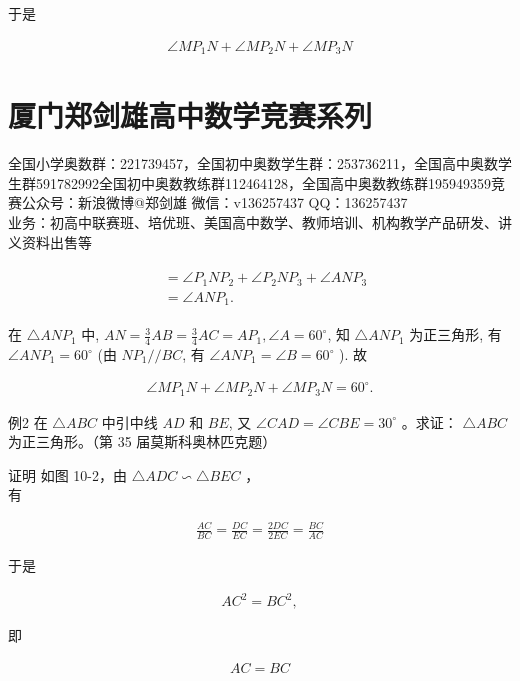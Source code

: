 \documentclass[10pt]{article}
\begin{document}
于是

\begin{align*}
\angle M P_{1} N+\angle M P_{2} N+\angle M P_{3} N
\end{align*}

\section*{厦门郑剑雄高中数学竞赛系列}
全国小学奥数群：221739457，全国初中奥数学生群：253736211，全国高中奥数学生群591782992全国初中奥数教练群112464128，全国高中奥数教练群195949359竞赛公众号：新浪微博@郑剑雄 微信：v136257437 QQ：136257437\\
业务：初高中联赛班、培优班、美国高中数学、教师培训、机构教学产品研发、讲义资料出售等

\begin{align*}
\begin{aligned}
& =\angle P_{1} N P_{2}+\angle P_{2} N P_{3}+\angle A N P_{3} \\
& =\angle A N P_{1} .
\end{aligned}
\end{align*}

在 $\triangle A N P_{1}$ 中, $A N=\frac{3}{4} A B=\frac{3}{4} A C=A P_{1}, \angle A=60^{\circ}$, 知 $\triangle A N P_{1}$ 为正三角形, 有 $\angle A N P_{1}=60^{\circ}$ (由 $N P_{1} / / B C$, 有 $\angle A N P_{1}=\angle B=60^{\circ}$ ). 故

\begin{align*}
\angle M P_{1} N+\angle M P_{2} N+\angle M P_{3} N=60^{\circ} .
\end{align*}

例2 在 $\triangle A B C$ 中引中线 $A D$ 和 $B E$, 又 $\angle C A D=\angle C B E=30^{\circ}$ 。求证： $\triangle A B C$ 为正三角形。（第 35 届莫斯科奥林匹克题）

证明 如图 10-2，由 $\triangle A D C \backsim \triangle B E C$ ，\\
有

\begin{align*}
\frac{A C}{B C}=\frac{D C}{E C}=\frac{2 D C}{2 E C}=\frac{B C}{A C}
\end{align*}

于是

\begin{align*}
A C^{2}=B C^{2},
\end{align*}

即

\begin{align*}
A C=B C
\end{align*}
\end{document}
